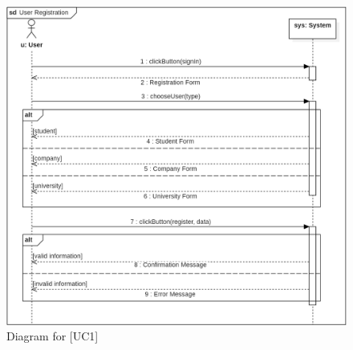 \begin{figure} [H]
    \centering
    \includegraphics[width=1\linewidth]{Use Cases Images/user_registration.png}
    \caption{Diagram for [UC1]}
    \label{fig: User Registration Diagram}
\end{figure}



